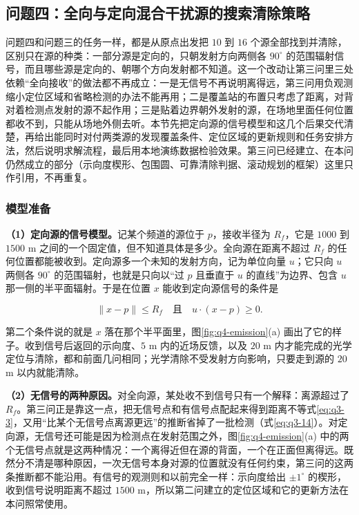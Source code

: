 \subsection{问题四：全向与定向混合干扰源的搜索清除策略}\label{sec:q4}

问题四和问题三的任务一样，都是从原点出发把 $10$ 到 $16$ 个源全部找到并清除，区别只在源的种类：一部分源是定向的，只朝发射方向两侧各 $90^\circ$ 的范围辐射信号，而且哪些源是定向的、朝哪个方向发射都不知道。这一个改动让第三问里三处依赖“全向接收”的做法都不再成立：一是无信号不再说明离得远，第三问用负观测缩小定位区域和省略检测的办法不能再用；二是覆盖站的布置只考虑了距离，对背对着检测点发射的源不起作用；三是贴着边界朝外发射的源，在场地里面任何位置都收不到，只能从场地外侧去听。本节先把定向源的信号模型和这几个后果交代清楚，再给出能同时对付两类源的发现覆盖条件、定位区域的更新规则和任务安排方法，然后说明求解流程，最后用本地演练数据检验效果。第三问已经建立、在本问仍然成立的部分（示向度楔形、包围圆、可靠清除判据、滚动规划的框架）这里只作引用，不再重复。

\subsubsection{模型准备}\label{sec:q4-1}

\textbf{（1）定向源的信号模型。}记某个频道的源位于 $p$，接收半径为 $R_f$，它是 $1000$ 到 $1500$ m 之间的一个固定值，但不知道具体是多少。全向源在距离不超过 $R_f$ 的任何位置都能被收到。定向源多一个未知的发射方向，记为单位向量 $u$；它只向 $u$ 两侧各 $90^\circ$ 的范围辐射，也就是只向以“过 $p$ 且垂直于 $u$ 的直线”为边界、包含 $u$ 那一侧的半平面辐射。于是在位置 $x$ 能收到定向源信号的条件是

\begin{equation}\label{eq:q4-1}
\|x-p\|\le R_f\quad\text{且}\quad u\cdot(x-p)\ge0 .
\end{equation}

第二个条件说的就是 $x$ 落在那个半平面里，图\ref{fig:q4-emission}(a) 画出了它的样子。收到信号后返回的示向度、$5$ m 内的近场反馈，以及 $20$ m 内才能完成的光学定位与清除，都和前面几问相同；光学清除不受发射方向影响，只要走到源的 $20$ m 以内就能清除。

\textbf{（2）无信号的两种原因。}对全向源，某处收不到信号只有一个解释：离源超过了 $R_f$。第三问正是靠这一点，把无信号点和有信号点配起来得到距离不等式\eqref{eq:q3-3}，又用“比某个无信号点离源更远”的推断省掉了一批检测（式\eqref{eq:q3-14}）。对定向源，无信号还可能是因为检测点在发射范围之外，图\ref{fig:q4-emission}(a) 中的两个无信号点就是这两种情况：一个离得近但在源的背面，一个在正面但离得远。既然分不清是哪种原因，一次无信号本身对源的位置就没有任何约束，第三问的这两条推断都不能沿用。有信号的观测则和以前完全一样：示向度给出 $\pm1^\circ$ 的楔形，收到信号说明距离不超过 $1500$ m，所以第二问建立的定位区域和它的更新方法在本问照常使用。

